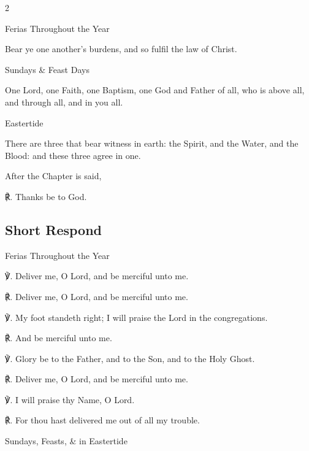 \begin{multicols}{2}
\begin{inhead}
	Ferias Throughout the Year
\end{inhead}\par\noindent
Bear ye one another's burdens, and so fulfil the law of Christ.

\begin{inhead}
	Sundays \& Feast Days
\end{inhead}\par\noindent
One Lord, one Faith, one Baptism, one God and Father of all, who is above all, and through all, and in you all.

\begin{inhead}
	Eastertide
\end{inhead}\par\noindent
There are three that bear witness in earth: the Spirit, and the Water, and the Blood: and these three agree in one.
\begin{rubric}
	After the Chapter is said,
\end{rubric}
℟. Thanks be to God.


\subsection{Short Respond}


\begin{inhead}
	Ferias Throughout the Year
\end{inhead}
℣. Deliver me, O Lord, and be merciful unto me.

℟. Deliver me, O Lord, and be merciful unto me.

℣. My foot standeth right; I will praise the Lord in the congregations.

℟. And be merciful unto me.

℣. Glory be to the Father, and to the Son, and to the Holy Ghost.

℟. Deliver me, O Lord, and be merciful unto me.

℣. I will praise thy Name, O Lord.

℟. For thou hast delivered me out of all my trouble.

\begin{inhead}
	Sundays, Feasts, \& in Eastertide
\end{inhead}


\end{multicols}
